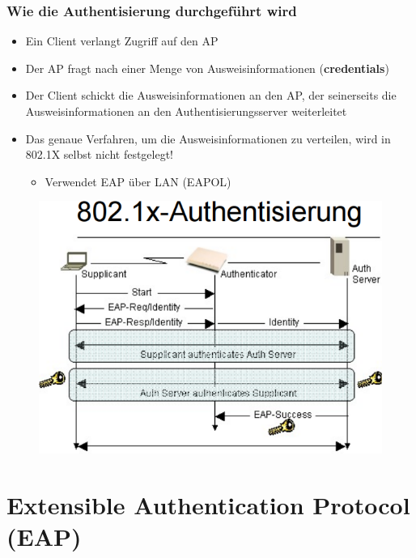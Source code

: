 \documentclass[openany]{book}
\begin{document}
\subsubsection{Wie die Authentisierung durchgeführt wird}

\begin{itemize}
    \item Ein Client verlangt Zugriff auf den AP
    \item Der AP fragt nach einer Menge von Ausweisinformationen (\textbf{credentials})
    \item Der Client schickt die Ausweisinformationen an den AP, der seinerseits die Ausweisinformationen an den Authentisierungsserver weiterleitet
    \item Das genaue Verfahren, um die Ausweisinformationen zu verteilen, wird in 802.1X selbst nicht festgelegt!
    \begin{itemize}
        \item Verwendet EAP über LAN (EAPOL)
    \end{itemize}
\end{itemize}

\begin{figure}[h!]
    \centering
    \includegraphics[width=0.85\linewidth]{Pics/802.1X.PNG}
\end{figure}

\newpage

\section{Extensible Authentication Protocol (EAP)}
\end{document}
